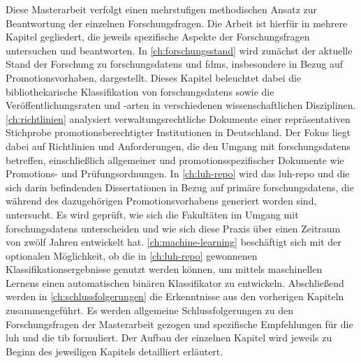 Diese Masterarbeit verfolgt einen mehrstufigen methodischen Ansatz zur Beantwortung der einzelnen Forschungsfragen.
Die Arbeit ist hierfür in mehrere Kapitel gegliedert, die jeweils spezifische Aspekte der Forschungsfragen untersuchen und beantworten.
%
In \cref{ch:forschungsstand} wird zunächst der aktuelle Stand der Forschung zu \glspl{forschungsdaten} und \glspl{fdm}, insbesondere in Bezug auf Promotionsvorhaben, dargestellt.
Dieses Kapitel beleuchtet dabei die bibliothekarische Klassifikation von \glspl{forschungsdaten} sowie die Veröffentlichungsraten und -arten in verschiedenen wissenschaftlichen Disziplinen.
%
\cref{ch:richtlinien} analysiert verwaltungsrechtliche Dokumente einer repräsentativen Stichprobe promotionsberechtigter Institutionen in Deutschland.
Der Fokus liegt dabei auf Richtlinien und Anforderungen, die den Umgang mit \glspl{forschungsdaten} betreffen, einschließlich allgemeiner und promotionsspezifischer Dokumente wie Promotions- und Prüfungsordnungen.
%
In \cref{ch:luh-repo} wird das \gls{luh-repo} und die sich darin befindenden Dissertationen in Bezug auf primäre \glspl{forschungsdaten}, die während des dazugehörigen Promotionsvorhabens generiert worden sind, untersucht.
Es wird geprüft, wie sich die Fakultäten im Umgang mit \glspl{forschungsdaten} unterscheiden und wie sich diese Praxis über einen Zeitraum von zwölf Jahren entwickelt hat.
%
\cref{ch:machine-learning} beschäftigt sich mit der optionalen Möglichkeit, ob die in \cref{ch:luh-repo} gewonnenen Klassifikationsergebnisse genutzt werden können, um mittels maschinellen Lernens einen automatischen binären Klassifikator zu entwickeln.
%
Abschließend werden in \cref{ch:schlussfolgerungen} die Erkenntnisse aus den vorherigen Kapiteln zusammengeführt.
Es werden allgemeine Schlussfolgerungen zu den Forschungsfragen der Masterarbeit gezogen und spezifische Empfehlungen für die \gls{luh} und die \gls{tib} formuliert.
%
Der Aufbau der einzelnen Kapitel wird jeweils zu Beginn des jeweiligen Kapitels detailliert erläutert.